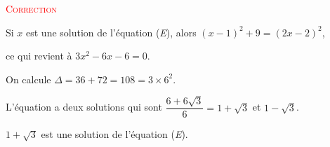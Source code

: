 \begin{enumerate}
		\textcolor{red}{\textsc{Correction}}

		Si $x$ est une solution de l'équation (\textit{E}), alors \quad \mbox{$(x-1)^2+9=(2x-2)^2$},

		ce qui revient à \quad \mbox{$3x^2-6x-6=0$}.

		On calcule \quad \mbox{$\Delta=36+72=108=3\times6^2$}.

		L'équation a deux solutions qui sont \quad  \mbox{$\dfrac{6+6\sqrt3}{6}=1+\sqrt3$} \quad et \quad \mbox{$1-\sqrt3$}.

		\mbox{$1+\sqrt3$} est une solution de l'équation (\textit{E}).
\end{enumerate}
